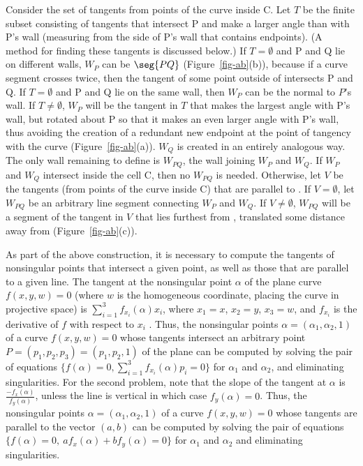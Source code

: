 Consider the set of tangents from points of the curve inside C.
Let $T$ be the finite subset consisting of tangents that intersect P
and make a larger angle than  with P's wall 
(measuring from the side of P's wall that contains endpoints).
(A method for finding these tangents is discussed below.)
If $T = \emptyset$ and P and Q lie on different walls,
$W_{P}$ can be $\seg{PQ}$ (Figure~\ref{fig-ab}(b)), 
because if a curve segment crosses  
twice, then the tangent of some point outside of  intersects P and Q.
If $T = \emptyset$ and P and Q lie on the same wall, 
then $W_{P}$ can be the normal to $P$'s wall.
If $T \neq \emptyset$, $W_{P}$ will be
the tangent in $T$ that makes the largest angle with P's wall,
but rotated about P so that
it makes an even larger angle with P's wall, thus avoiding the creation of a redundant
new endpoint at the point of tangency with the curve (Figure~\ref{fig-ab}(a)).
$W_{Q}$ is created in an entirely analogous way.
The only wall remaining to define is $W_{PQ}$, the wall joining $W_{P}$ and $W_{Q}$.
If $W_{P}$ and $W_{Q}$ intersect inside the cell C, then no $W_{PQ}$ is needed.
Otherwise, let $V$ be the tangents (from points of the curve inside C) that are
parallel to .
If $V = \emptyset$, let $W_{PQ}$ be an arbitrary line segment connecting $W_{P}$
and $W_{Q}$.
If $V \neq \emptyset$, $W_{PQ}$ will be a segment of the tangent in $V$ 
that lies furthest from , translated some distance away from 
(Figure~\ref{fig-ab}(c)).


As part of the above construction, it is necessary to compute the tangents of nonsingular
points that intersect a given point, as well as those that are parallel to a given line.
The tangent at the nonsingular point $\alpha$ of the plane
curve $f(x,y,w)=0$ (where $w$ is the homogeneous coordinate, placing the curve in
projective space) is $\sum_{i=1}^{3} f_{x_{i}}(\alpha) x_{i}$, where $x_{1} = x$,
$x_{2} = y$, $x_{3} = w$, and $f_{x_{i}}$ is the derivative of $f$ with respect to $x_{i}$
\cite[p. 55]{walker}.
Thus, the nonsingular points $\alpha = (\alpha_{1}, \alpha_{2}, 1)$ of a curve $f(x,y,w)=0$
whose tangents intersect an arbitrary point $P = (p_{1},p_{2},p_{3}) = (p_{1},p_{2},1)$
of the plane can be computed by solving the pair of equations 
$\{f(\alpha) = 0, \sum_{i=1}^{3} f_{x_{i}}(\alpha) p_{i} = 0 \}$ 
for $\alpha_{1}$ and $\alpha_{2}$, and eliminating singularities.
For the second problem, note that the slope of the tangent at $\alpha$ is 
$\frac{-f_{x}(\alpha)}{f_{y}(\alpha)}$, unless the line is vertical in which case 
$f_{y}(\alpha) = 0$.
Thus, the nonsingular points $\alpha = (\alpha_{1}, \alpha_{2}, 1)$ of a curve $f(x,y,w)=0$
whose tangents are parallel to the vector $(a,b)$
can be computed by solving the pair of equations 
$\{f(\alpha) = 0,\ a f_{x}(\alpha) + b f_{y}(\alpha) = 0 \}$ 
for $\alpha_{1}$ and $\alpha_{2}$ and eliminating singularities.


